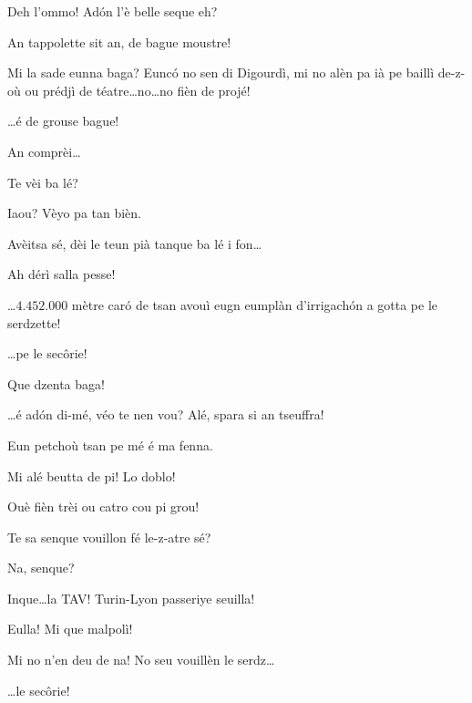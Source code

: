 \begin{drama}

\Dallasspeaks Deh l'ommo! Ad\'on l'è belle seque eh?

\Pompiolenspeaks An tappolette sit an, de bague moustre!

\Dallasspeaks Mi la sade eunna baga? Eunc\'o no sen di Digourdì, mi no alèn pa ià pe baillì de-z-où ou prédjì de téatre\ldots no\ldots no fièn de projé!

\Joellespeaks \ldots é de grouse bague!

\Pompiolenspeaks An comprèi\ldots

\Dallasspeaks{} Te vèi ba lé?


\Pompiolenspeaks {} Iaou? Vèyo pa tan bièn.

\Dallasspeaks Avèitsa sé, dèi le teun pià tanque ba lé i fon\ldots

\Pompiolenspeaks Ah dérì salla pesse!

\Dallasspeaks \ldots $4.452.000$ mètre car\'o de tsan avouì eugn eumplàn d'irrigach\'on a gotta pe le serdzette!

\Joellespeaks \ldots pe le sec\^orie! 

\Pompiolenspeaks Que dzenta baga!

\Dallasspeaks \ldots é ad\'on di-mé, véo te nen vou? Alé, spara si an tseuffra!

\Pompiolenspeaks Eun petchoù tsan pe mé é ma fenna.

\Dallasspeaks Mi alé beutta de pi! Lo doblo!

\Joellespeaks Ouè fièn trèi ou catro cou pi grou!

\Dallasspeaks {} Te sa senque vouillon fé le-z-atre sé?

\Pompiolenspeaks Na, senque?

\Dallasspeaks Inque\ldots la TAV! Turin-Lyon passeriye seuilla!

\Pompiolenspeaks {} Eulla! Mi que malpolì!

\Dallasspeaks Mi no n'en deu de na! No seu vouillèn le serdz\ldots


\Dallasspeaks \ldots le sec\^orie!


\end{drama}

